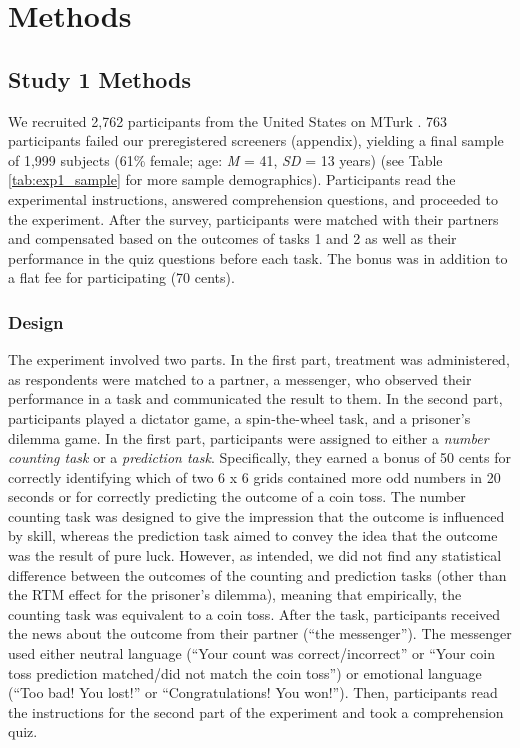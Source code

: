 \section{Methods}

\subsection{Study 1 Methods}

We recruited 2,762 participants from the United States on MTurk
\citep{berinsky2012evaluating}. 763 participants failed our preregistered
screeners (appendix), yielding a final sample of 1,999 subjects (61\%
female; age: \emph{M} = 41, \emph{SD} = 13 years) (see Table \ref{tab:exp1_sample} for more sample demographics). 
Participants read the
experimental instructions, answered comprehension questions, and
proceeded to the experiment. After the survey, participants were matched
with their partners and compensated based on the outcomes of tasks 1 and
2 as well as their performance in the quiz questions before each task.
The bonus was in addition to a flat fee for participating (70 cents).

\subsubsection{Design}

The experiment involved two parts. In the first part, treatment was
administered, as respondents were matched to a partner, a messenger, who
observed their performance in a task and communicated the result to
them. In the second part, participants played a dictator game, a
spin-the-wheel task, and a prisoner's dilemma game. In the first part,
participants were assigned to either a \emph{number counting task} or a
\emph{prediction task}. Specifically, they earned a bonus of 50 cents
for correctly identifying which of two 6 x 6 grids contained more odd
numbers in 20 seconds or for correctly predicting the outcome of a coin
toss. The number counting task was designed to give the impression that
the outcome is influenced by skill, whereas the prediction task aimed to
convey the idea that the outcome was the result of pure luck. However,
as intended, we did not find any statistical difference between the
outcomes of the counting and prediction tasks (other than the RTM effect for the prisoner's dilemma), 
meaning that empirically,
the counting task was equivalent to a coin toss. After the task,
participants received the news about the outcome from their partner
(``the messenger''). The messenger used either neutral language (``Your
count was correct/incorrect'' or ``Your coin toss prediction matched/did
not match the coin toss'') or emotional language (``Too bad! You lost!''
or ``Congratulations! You won!''). Then, participants read the
instructions for the second part of the experiment and took a
comprehension quiz.

